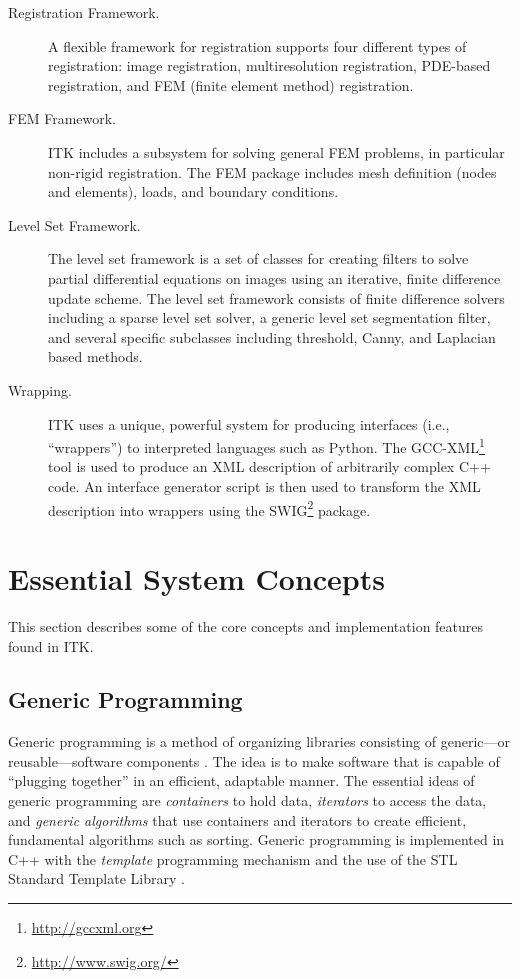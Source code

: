 \begin{description}
	\item[Registration Framework.] A flexible framework for registration
        supports four different types of registration: image registration,
        multiresolution registration, PDE-based registration, and FEM (finite
        element method) registration.

	\item[FEM Framework.] ITK includes a subsystem for solving general
        FEM problems, in particular non-rigid registration. The FEM package
        includes mesh definition (nodes and elements), loads, and boundary
        conditions.

	\item[Level Set Framework.] The level set framework is a set of
        classes for creating filters to solve partial differential equations
        on images using an iterative, finite difference update scheme. The
        level set framework consists of finite difference solvers including a
        sparse level set solver, a generic level set segmentation filter, and
        several specific subclasses including threshold, Canny, and Laplacian
        based methods.

	\item[Wrapping.] ITK uses a unique, powerful system for
	   producing interfaces (i.e., ``wrappers'') to interpreted
	   languages such as Python. The GCC-XML\footnote{\url{http://gccxml.org}}
       tool is used to produce an XML description of arbitrarily complex C++ code.
	   An interface generator script is then used to transform the XML description
       into wrappers using the SWIG\footnote{\url{http://www.swig.org/}} package.

\end{description}


\section{Essential System Concepts}
\label{sec:EssentialSystemConcepts}

This section describes some of the core concepts and implementation features
found in ITK.

\subsection{Generic Programming}
\label{sec:GenericProgramming}


Generic programming is a method of organizing libraries consisting of
generic---or reusable---software components \cite{Musser1996}. The idea is to
make software that is capable of ``plugging together'' in an efficient,
adaptable manner. The essential ideas of generic programming are
\emph{containers} to hold data, \emph{iterators} to access the data, and
\emph{generic algorithms} that use containers and iterators to create
efficient, fundamental algorithms such as sorting. Generic programming is
implemented in C++ with the \emph{template} programming mechanism and the
use of the STL Standard Template Library \cite{Austern1999}.

